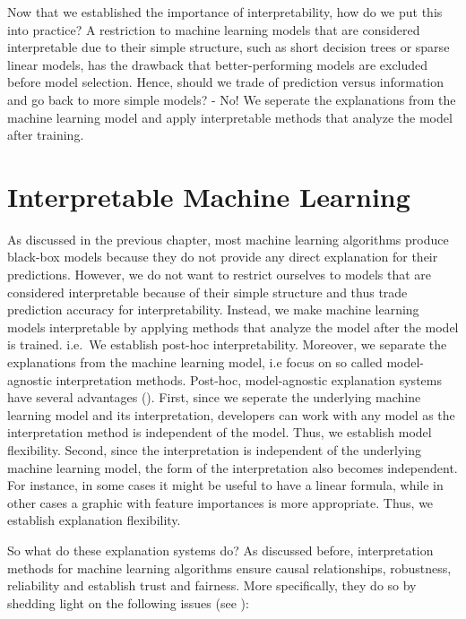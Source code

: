 \documentclass[]{krantz}
\begin{document}
Now that we established the importance of interpretability, how do we
put this into practice? A restriction to machine learning models that
are considered interpretable due to their simple structure, such as
short decision trees or sparse linear models, has the drawback that
better-performing models are excluded before model selection. Hence,
should we trade of prediction versus information and go back to more
simple models? - No! We seperate the explanations from the machine
learning model and apply interpretable methods that analyze the model
after training.

\section{Interpretable Machine
Learning}\label{interpretable-machine-learning}

As discussed in the previous chapter, most machine learning algorithms
produce black-box models because they do not provide any direct
explanation for their predictions. However, we do not want to restrict
ourselves to models that are considered interpretable because of their
simple structure and thus trade prediction accuracy for
interpretability. Instead, we make machine learning models interpretable
by applying methods that analyze the model after the model is trained.
i.e.~We establish post-hoc interpretability. Moreover, we separate the
explanations from the machine learning model, i.e focus on so called
model-agnostic interpretation methods. Post-hoc, model-agnostic
explanation systems have several advantages (\citet{ribeiro2016model}).
First, since we seperate the underlying machine learning model and its
interpretation, developers can work with any model as the interpretation
method is independent of the model. Thus, we establish model
flexibility. Second, since the interpretation is independent of the
underlying machine learning model, the form of the interpretation also
becomes independent. For instance, in some cases it might be useful to
have a linear formula, while in other cases a graphic with feature
importances is more appropriate. Thus, we establish explanation
flexibility.

So what do these explanation systems do? As discussed before,
interpretation methods for machine learning algorithms ensure causal
relationships, robustness, reliability and establish trust and fairness.
More specifically, they do so by shedding light on the following issues
(see \citet{molnar2019}):
\end{document}
